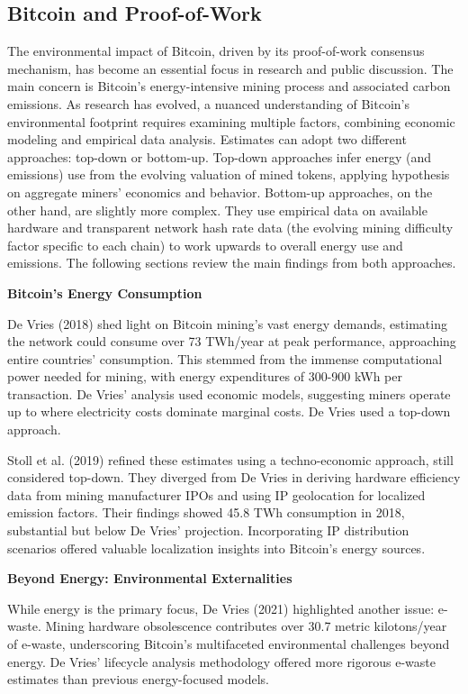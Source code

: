 \documentclass[11pt]{report}
\begin{document}
\subsection{Bitcoin and Proof-of-Work}
The environmental impact of Bitcoin, driven by its proof-of-work consensus mechanism, has become an essential focus in research and public discussion. The main concern is Bitcoin's energy-intensive mining process and associated carbon emissions. As research has evolved, a nuanced understanding of Bitcoin's environmental footprint requires examining multiple factors, combining economic modeling and empirical data analysis. Estimates can adopt two different approaches: top-down or bottom-up. Top-down approaches infer energy (and emissions) use from the evolving valuation of mined tokens, applying hypothesis on aggregate miners' economics and behavior. Bottom-up approaches, on the other hand, are slightly more complex. They use empirical data on available hardware and transparent network hash rate data (the evolving mining difficulty factor specific to each chain) to work upwards to overall energy use and emissions. The following sections review the main findings from both approaches.

\textbf{Bitcoin's Energy Consumption}

De Vries (2018) \cite{devriesBitcoinGrowingEnergy2018} shed light on Bitcoin mining's vast energy demands, estimating the network could consume over 73 TWh/year at peak performance, approaching entire countries' consumption. This stemmed from the immense computational power needed for mining, with energy expenditures of 300-900 kWh per transaction. De Vries' analysis used economic models, suggesting miners operate up to where electricity costs dominate marginal costs. De Vries used a top-down approach.

Stoll et al. (2019) \cite{stollCarbonFootprintBitcoin2019} refined these estimates using a techno-economic approach, still considered top-down. They diverged from De Vries in deriving hardware efficiency data from mining manufacturer IPOs and using IP geolocation for localized emission factors. Their findings showed 45.8 TWh consumption in 2018, substantial but below De Vries' projection. Incorporating IP distribution scenarios offered valuable localization insights into Bitcoin's energy sources.

\textbf{Beyond Energy: Environmental Externalities}

While energy is the primary focus, De Vries (2021) \cite{devriesBitcoinGrowingEwaste2021} highlighted another issue: e-waste. Mining hardware obsolescence contributes over 30.7 metric kilotons/year of e-waste, underscoring Bitcoin's multifaceted environmental challenges beyond energy. De Vries' lifecycle analysis methodology offered more rigorous e-waste estimates than previous energy-focused models.
\end{document}
